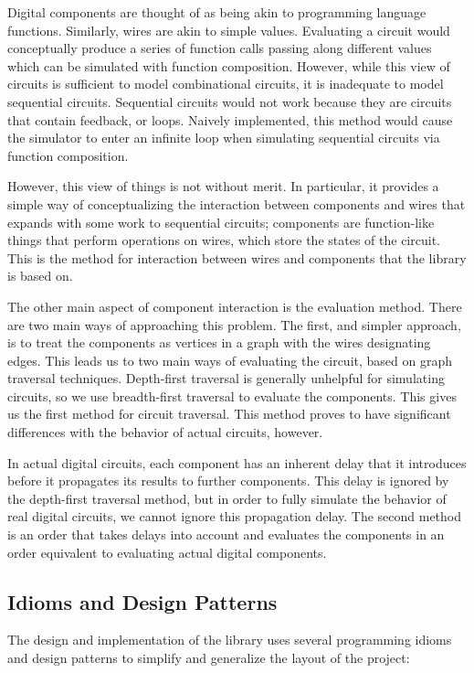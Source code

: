 \documentclass{article}
\begin{document}
Digital components are thought of as being akin to programming language functions. Similarly, wires are akin to simple values. Evaluating a circuit would conceptually produce a series of function calls passing along different values which can be simulated with function composition. However, while this view of circuits is sufficient to model combinational circuits, it is inadequate to model sequential circuits. Sequential circuits would not work because they are circuits that contain feedback, or loops. Naively implemented, this method would cause the simulator to enter an infinite loop when simulating sequential circuits via function composition.

However, this view of things is not without merit. In particular, it provides a simple way of conceptualizing the interaction between components and wires that expands with some work to sequential circuits; components are function-like things that perform operations on wires, which store the states of the circuit. This is the method for interaction between wires and components that the library is based on.

The other main aspect of component interaction is the evaluation method. There are two main ways of approaching this problem. The first, and simpler approach, is to treat the components as vertices in a graph with the wires designating edges. This leads us to two main ways of evaluating the circuit, based on graph traversal techniques. Depth-first traversal is generally unhelpful for simulating circuits, so we use breadth-first traversal to evaluate the components. This gives us the first method for circuit traversal. This method proves to have significant differences with the behavior of actual circuits, however.

In actual digital circuits, each component has an inherent delay that it introduces before it propagates its results to further components. This delay is ignored by the depth-first traversal method, but in order to fully simulate the behavior of real digital circuits, we cannot ignore this propagation delay. The second method is an order that takes delays into account and evaluates the components in an order equivalent to evaluating actual digital components.

\subsection{Idioms and Design Patterns}

The design and implementation of the library uses several programming idioms and design patterns\cite{gof} to simplify and generalize the layout of the project:
\end{document}
